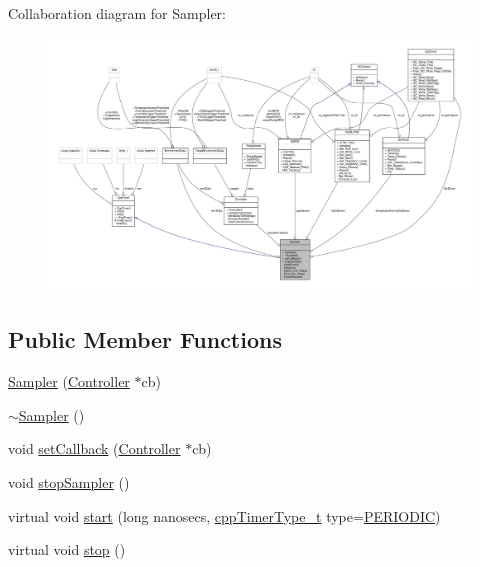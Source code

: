 Collaboration diagram for Sampler\+:\nopagebreak
\begin{figure}[H]
\begin{center}
\leavevmode
\includegraphics[width=350pt]{classSampler__coll__graph}
\end{center}
\end{figure}
\subsection*{Public Member Functions}
\begin{DoxyCompactItemize}
\item 
\hyperlink{classSampler_aec4905ed5f8259bb5e361da172bf7f17}{Sampler} (\hyperlink{classController}{Controller} $\ast$cb)
\item 
\hyperlink{classSampler_afbbbd238b78dd3024686c852b69fa64e}{$\sim$\+Sampler} ()
\item 
void \hyperlink{classSampler_a026a0839919e8e93fa75f19b67ccffc6}{set\+Callback} (\hyperlink{classController}{Controller} $\ast$cb)
\item 
void \hyperlink{classSampler_af661f48134a6d0f1f2d6080f5025392e}{stop\+Sampler} ()
\item 
virtual void \hyperlink{classCppTimer_a64989025caa3c030c6c397ca76a2d20b}{start} (long nanosecs, \hyperlink{CppTimer_8h_a110d07ab6a96d7815149d3d95435790a}{cpp\+Timer\+Type\+\_\+t} type=\hyperlink{CppTimer_8h_a110d07ab6a96d7815149d3d95435790aae4379d044711537d9ce3b3b58c575c58}{P\+E\+R\+I\+O\+D\+IC})
\item 
virtual void \hyperlink{classCppTimer_a4bb95ddee98a536d0818b8f6096bf7e7}{stop} ()
\end{DoxyCompactItemize}
